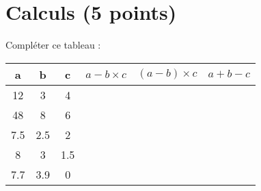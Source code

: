 \section{Calculs (5 points)}

\begin{questions}


\question Compléter ce tableau :

\begin{center}
	{\Large \begin{tabular}{|@{\ }c@{\ }|@{\ }c@{\ }|@{\ }c@{\ }|@{\ }c@{\ }|@{\ }c@{\ }|@{\ }c@{\ }|}
	\hline
	\textbf{a} & \textbf{b} & \textbf{c} & \textbf{$a-b \times c$} & \textbf{$(a-b) \times c$} & \textbf{$a + b - c$} \\ \hline
	12         & 3          & 4          &                         &                           &                      \\ \hline
	48         & 8          & 6          &                         &                           &                      \\ \hline
	\num{7.5}  & \num{2.5}  & 2          &                         &                           &                      \\ \hline
	8          & 3          & \num{1.5}  &                         &                           &                      \\ \hline
	\num{7.7}  & \num{3.9}  & 0          &                         &                           &                      \\ \hline
\end{tabular}}
\end{center}
\end{questions}